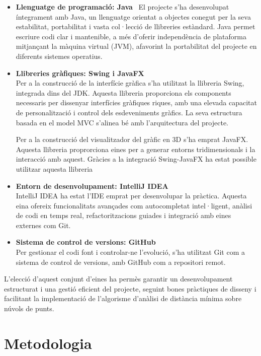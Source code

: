 \documentclass{ieeetj}
\begin{document}
\begin{itemize} 
    \item \textbf{Llenguatge de programació: Java} \ El projecte s’ha desenvolupat íntegrament amb Java, un llenguatge orientat a objectes conegut per la seva estabilitat, portabilitat i vasta col·lecció de llibreries estàndard. Java permet escriure codi clar i mantenible, a més d’oferir independència de plataforma mitjançant la màquina virtual (JVM), afavorint la portabilitat del projecte en diferents sistemes operatius.
    \item \textbf{Llibreries gràfiques: Swing i JavaFX} \\
    Per a la construcció de la interfície gràfica s’ha utilitzat la llibreria Swing, integrada dins del JDK. Aquesta llibreria proporciona els components necessaris per dissenyar interfícies gràfiques riques, amb una elevada capacitat de personalització i control dels esdeveniments gràfics. La seva estructura basada en el model MVC s’alinea bé amb l’arquitectura del projecte.

    Per a la construcció del visualitzador del gràfic en 3D s'ha emprat JavaFX. Aquesta llibreria proprorciona eines per a generar entorns tridimensionals i la interacció amb aquest. Gràcies a la integració Swing-JavaFX ha estat possible utilitzar aquesta llibreria
    
    \item \textbf{Entorn de desenvolupament: IntelliJ IDEA} \\
    IntelliJ IDEA ha estat l’IDE emprat per desenvolupar la pràctica. Aquesta eina ofereix funcionalitats avançades com autocompletat intel·ligent, anàlisi de codi en temps real, refactoritzacions guiades i integració amb eines externes com Git. 
    
    \item \textbf{Sistema de control de versions: GitHub} \\
    Per gestionar el codi font i controlar-ne l’evolució, s’ha utilitzat Git com a sistema de control de versions, amb GitHub com a repositori remot. 
\end{itemize}

L’elecció d’aquest conjunt d’eines ha permès garantir un desenvolupament estructurat i una gestió eficient del projecte, seguint bones pràctiques de disseny i facilitant la implementació de l’algorisme d’anàlisi de distància mínima sobre núvols de punts.


\section{Metodologia}
\end{document}
